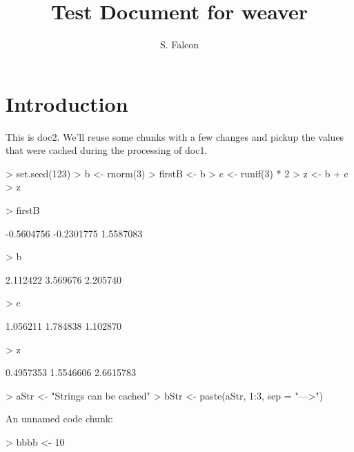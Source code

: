 \documentclass[11pt]{article}
\title{Test Document for weaver}
\author{S. Falcon}
\begin{document}
\maketitle

\section{Introduction}

This is doc2.  We'll reuse some chunks with a few changes and pickup
the values that were cached during the processing of doc1.

\begin{Schunk}
\begin{Sinput}
> set.seed(123)
> b <- rnorm(3)
> firstB <- b
> c <- runif(3) * 2
> z <- b + c
> z
\end{Sinput}
\end{Schunk}


\begin{Schunk}
\begin{Sinput}
> firstB
\end{Sinput}
\begin{Soutput}
[1] -0.5604756 -0.2301775  1.5587083
\end{Soutput}
\begin{Sinput}
> b
\end{Sinput}
\begin{Soutput}
[1] 2.112422 3.569676 2.205740
\end{Soutput}
\begin{Sinput}
> c
\end{Sinput}
\begin{Soutput}
[1] 1.056211 1.784838 1.102870
\end{Soutput}
\begin{Sinput}
> z
\end{Sinput}
\begin{Soutput}
[1] 0.4957353 1.5546606 2.6615783
\end{Soutput}
\end{Schunk}

\begin{Schunk}
\begin{Sinput}
> aStr <- "Strings can be cached"
> bStr <- paste(aStr, 1:3, sep = "--->")
\end{Sinput}
\end{Schunk}

An unnamed code chunk:

\begin{Schunk}
\begin{Sinput}
> bbbb <- 10
\end{Sinput}
\end{Schunk}
\end{document}
